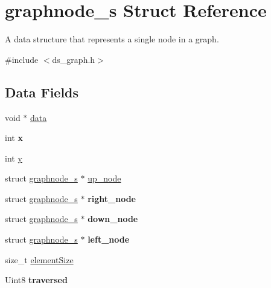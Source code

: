 \hypertarget{structgraphnode__s}{}\section{graphnode\+\_\+s Struct Reference}
\label{structgraphnode__s}


A data structure that represents a single node in a graph.  




{\ttfamily \#include $<$ds\+\_\+graph.\+h$>$}

\subsection*{Data Fields}
\begin{DoxyCompactItemize}
\item 
void $\ast$ \hyperlink{structgraphnode__s_a735984d41155bc1032e09bece8f8d66d}{data}
\item 
\mbox{\label{structgraphnode__s_a6150e0515f7202e2fb518f7206ed97dc}} 
int {\bfseries x}
\item 
int \hyperlink{structgraphnode__s_a0a2f84ed7838f07779ae24c5a9086d33}{y}
\item 
struct \hyperlink{structgraphnode__s}{graphnode\+\_\+s} $\ast$ \hyperlink{structgraphnode__s_a7101dbac1154ba59495fffbdb030eba2}{up\+\_\+node}
\item 
\mbox{\label{structgraphnode__s_a54cefd6e7df653a0115bae821fd1599c}} 
struct \hyperlink{structgraphnode__s}{graphnode\+\_\+s} $\ast$ {\bfseries right\+\_\+node}
\item 
\mbox{\label{structgraphnode__s_ae504c9f7ceef062009506664d993c7db}} 
struct \hyperlink{structgraphnode__s}{graphnode\+\_\+s} $\ast$ {\bfseries down\+\_\+node}
\item 
\mbox{\label{structgraphnode__s_af65e2cb312f851ac682c732ce717418b}} 
struct \hyperlink{structgraphnode__s}{graphnode\+\_\+s} $\ast$ {\bfseries left\+\_\+node}
\item 
size\+\_\+t \hyperlink{structgraphnode__s_af884332e6713af9425451adde09e0024}{element\+Size}
\item 
\mbox{\label{structgraphnode__s_a87f4c0982d29301b2438f3c7a3e2a493}} 
Uint8 {\bfseries traversed}
\end{DoxyCompactItemize}


